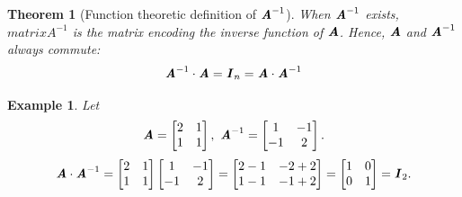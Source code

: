 \documentclass[12pt, a4paper]{article}
\newtheorem{thm}{Theorem}[subsection]
\newtheorem{eg}{Example}[subsection]
\def\matrixA{\textbf{\emph{A}}}
\def\matrixI{\textbf{\emph{I}}}
\begin{document}
\begin{thm}[Function theoretic definition of $\matrixA^{-1}$]
	When $\matrixA^{-1}$ exists, $matrixA^{-1}$ is the matrix encoding the inverse function of $\matrixA$. Hence, $\matrixA$ and $\matrixA^{-1}$ always commute: \[\matrixA^{-1}\cdot\matrixA=\matrixI_n=\matrixA\cdot\matrixA^{-1}\]	
\end{thm}
\begin{eg}
	Let \[\matrixA=\begin{bmatrix}2&1\\1&1\end{bmatrix},\ \matrixA^{-1}=\begin{bmatrix}1&-1\\-1&2\end{bmatrix}.\]
	\[\matrixA\cdot\matrixA^{-1}=\begin{bmatrix}2&1\\1&1\end{bmatrix}\begin{bmatrix}1&-1\\-1&2\end{bmatrix}=\begin{bmatrix}2-1&-2+2\\1-1&-1+2\end{bmatrix}=\begin{bmatrix}1&0\\0&1\end{bmatrix}=\matrixI_2.\]
\end{eg}
\end{document}
